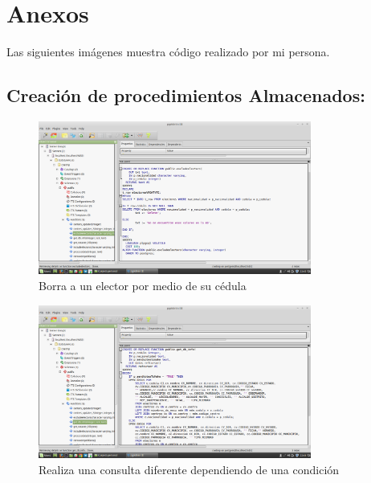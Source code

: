 \documentclass[12pt,oneside]{book}
\begin{document}
	
 	
	
	\chapter*{Anexos}
	Las siguientes imágenes muestra código realizado por mi persona.
	\section{Creación de procedimientos Almacenados:}
	
	\begin{figure}[H]
		\centering
		\includegraphics[width=0.8\textwidth]{excludeElector.png}
		\caption{Borra a un elector por medio de su cédula}
		\label{n1}
	\end{figure}

\begin{figure}[H]
	\centering
	\includegraphics[width=0.8\textwidth]{get_db_info.png}
	\caption{Realiza una consulta diferente dependiendo de una condición}
	\label{m1}
\end{figure}
\end{document}
